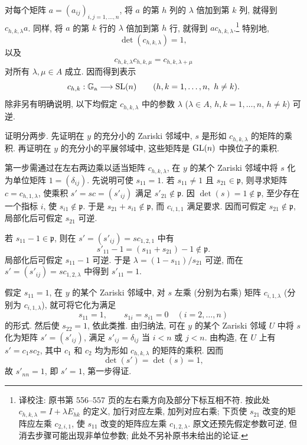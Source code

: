 对每个矩阵 $a=(a_{ij})_{i,j=1,\ldots,n}$, 将 $a$ 的第 $h$ 列的 $\lambda$ 倍加到第 $k$ 列, 就得到 $c_{h,k,\lambda}a$. 同样, 将 $a$ 的第 $k$ 行的 $\lambda$ 倍加到第 $h$ 行, 就得到 $a c_{h,k,\lambda}$.\footnote{译校注: 原书第 556--557 页的左右乘方向及部分下标互相不符. 按此处 $c_{h,k,\lambda}=I+\lambda E_{hk}$ 的定义, 加行对应左乘, 加列对应右乘; 下页使 $s_{21}$ 改变的矩阵应左乘 $c_{2,i,1}$, 使 $s_{11}$ 改变的矩阵应左乘 $c_{1,2,\lambda}$. 原文还预先假定参数可逆, 但消去步骤可能出现非单位参数; 此处不另补原书未给出的论证.} 特别地,
\[
\det(c_{h,k,\lambda})=1,
\]
以及
\begin{equation}\tag{6.3.1}
c_{h,k,\lambda}c_{h,k,\mu}=c_{h,k,\lambda+\mu}
\end{equation}
对所有 $\lambda,\mu\in A$ 成立. 因而得到表示
\[
c_{h,k}:\mathbb G_{\mathrm a}\longrightarrow\operatorname{SL}(n)
\qquad(h,k=1,\ldots,n,\ h\ne k).
\]
除非另有明确说明, 以下均假定 $c_{h,k,\lambda}$ 中的参数 $\lambda$ ($\lambda\in A$, $h,k=1,\ldots,n$, $h\ne k$) 可逆.
%

证明分两步. 先证明在 $y$ 的充分小的 Zariski 邻域中, $s$ 是形如 $c_{h,k,\lambda}$ 的矩阵的乘积. 再证明在 $y$ 的充分小的平展邻域中, 这些矩阵是 $\operatorname{GL}(n)$ 中换位子的乘积.
%
%
%

第一步需通过在左右两边乘以适当矩阵 $c_{h,k,\lambda}$, 在 $y$ 的某个 Zariski 邻域中将 $s$ 化为单位矩阵 $1=(\delta_{ij})$. 先说明可使 $s_{11}=1$. 若 $s_{11}\ne1$ 且 $s_{21}\in\mathfrak p$, 则寻求矩阵 $c=c_{h,1,\lambda}$, 使乘积 $s'=sc=(s'_{ij})$ 满足 $s'_{21}\notin\mathfrak p$. 因 $\det(s)=1\notin\mathfrak p$, 至少存在一个指标 $i$, 使 $s_{i1}\notin\mathfrak p$. 于是 $s_{21}+s_{i1}\notin\mathfrak p$, 而 $c_{i,1,1}$ 满足要求. 因而可假定 $s_{21}\notin\mathfrak p$, 局部化后可假定 $s_{21}$ 可逆.

若 $s_{11}-1\in\mathfrak p$, 则在 $s'=(s'_{ij})=sc_{1,2,1}$ 中有
\[
s'_{11}-1=(s_{11}+s_{21})-1\notin\mathfrak p.
\]
局部化后可假定 $s_{11}-1$ 可逆. 于是 $\lambda=(1-s_{11})/s_{21}$ 可逆, 而在 $s'=(s'_{ij})=sc_{1,2,\lambda}$ 中得到 $s'_{11}=1$.

假定 $s_{11}=1$, 在 $y$ 的某个 Zariski 邻域中, 对 $s$ 左乘 (分别为右乘) 矩阵 $c_{i,1,\lambda}$ (分别为 $c_{i,1,\lambda}$), 就可将它化为满足
\[
s_{11}=1,\qquad s_{1i}=s_{i1}=0\quad(i=2,\ldots,n)
\]
的形式. 然后使 $s_{22}=1$, 依此类推. 由归纳法, 可在 $y$ 的某个 Zariski 邻域 $U$ 中将 $s$ 化为矩阵 $s'=(s'_{ij})$, 满足 $s'_{ij}=\delta_{ij}$ 当 $i<n$ 或 $j<n$. 由构造, 在 $U$ 上有 $s'=c_1sc_2$, 其中 $c_1$ 和 $c_2$ 均为形如 $c_{h,k,\lambda}$ 的矩阵的乘积. 因而
\[
\det(s')=\det(s)=1,
\]
故 $s'_{nn}=1$, 即 $s'=1$, 第一步得证.

